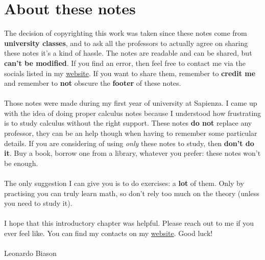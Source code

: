 \documentclass[12pt, letterpaper]{report}
\begin{document}
\setcounter{page}{0}

\pagestyle{fancy}

\pagebreak
\tableofcontents

\pagebreak

\setcounter{page}{0}
\setcounter{chapter}{-1}

\chapter{About these notes}
\label{chap:introduction}
\doclicenseThis
The decision of copyrighting this work was taken since these notes come from \textbf{university classes}, and to ask all the professors to actually agree on sharing these notes it's a kind of hassle. The notes are readable and can be shared, but \textbf{can't be modified}. If you find an error, then feel free to contact me via the socials listed in my \href{https://www.leonardobiason.com}{website}. If you want to share them, remember to \textbf{credit me} and remember to \textbf{not} obscure the \textbf{footer} of these notes. \\\\
\noindent Those notes were made during my first year of university at Sapienza. I came up with the idea of doing proper calculus notes because I understood how frustrating is to study calculus without the right support. These notes \textbf{do not} replace any professor, they can be an help though when having to remember some particular details. If you are considering of using \textit{only} these notes to study, then \textbf{don't do it}. Buy a book, borrow one from a library, whatever you prefer: these notes won't be enough. \\\\
\noindent The only suggestion I can give you is to do exercises: a \textbf{lot} of them. Only by practising you can truly learn math, so don't rely too much on the theory (unless you need to study it). \\\\
\noindent I hope that this introductory chapter was helpful. Please reach out to me if you ever feel like. You can find my contacts on my \href{https://www.leonardobiason.com}{website}. Good luck! \\\\
Leonardo Biason

\pagebreak

\pagebreak
\end{document}
